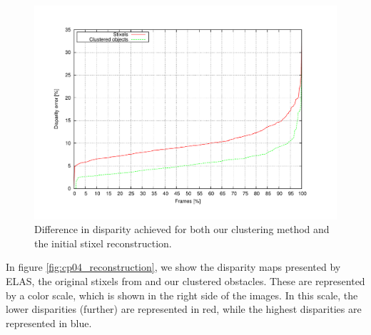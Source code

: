 \begin{figure}[h!]
\centering
\includegraphics[trim=50 40 80 60,clip]{disparity}
\caption{Difference in disparity achieved for both our clustering method and the initial stixel reconstruction.}\label{fig:cp04_disparity_comparison}
\end{figure}

In figure \ref{fig:cp04_reconstruction}, we show the disparity maps presented by \ac{ELAS}, the original stixels from \cite{benenson2011stixels} and our clustered obstacles. These are represented by a color scale, which is shown in the right side of the images. In this scale, the lower disparities (further) are represented in red, while the highest disparities are represented in blue.

